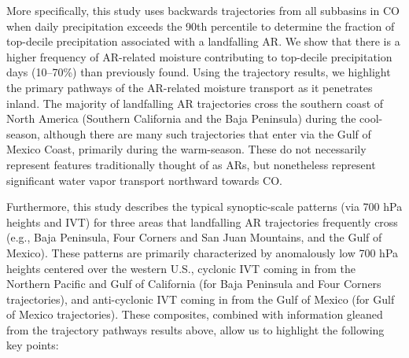 \documentclass[draft]{agujournal2019}
\begin{document}
More specifically, this study uses backwards trajectories from all subbasins in CO when daily precipitation exceeds the 90th percentile to determine the fraction of top-decile precipitation associated with a landfalling AR. We show that there is a higher frequency of AR-related moisture contributing to top-decile precipitation days (10--70\%) than previously found. Using the trajectory results, we highlight the primary pathways of the AR-related moisture transport as it penetrates inland. The majority of landfalling AR trajectories cross the southern coast of North America (Southern California and the Baja Peninsula) during the cool-season, although there are many such trajectories that enter via the Gulf of Mexico Coast, primarily during the warm-season. These do not necessarily represent features traditionally thought of as ARs, but nonetheless represent significant water vapor transport northward towards CO.

Furthermore, this study describes the typical synoptic-scale patterns (via 700 hPa heights and IVT) for three areas that landfalling AR trajectories frequently cross (e.g., Baja Peninsula, Four Corners and San Juan Mountains, and the Gulf of Mexico). These patterns are primarily characterized by anomalously low 700 hPa heights centered over the western U.S., cyclonic IVT coming in from the Northern Pacific and Gulf of California (for Baja Peninsula and Four Corners trajectories), and anti-cyclonic IVT coming in from the Gulf of Mexico (for Gulf of Mexico trajectories). These composites, combined with information gleaned from the trajectory pathways results above, allow us to highlight the following key points:
\end{document}
